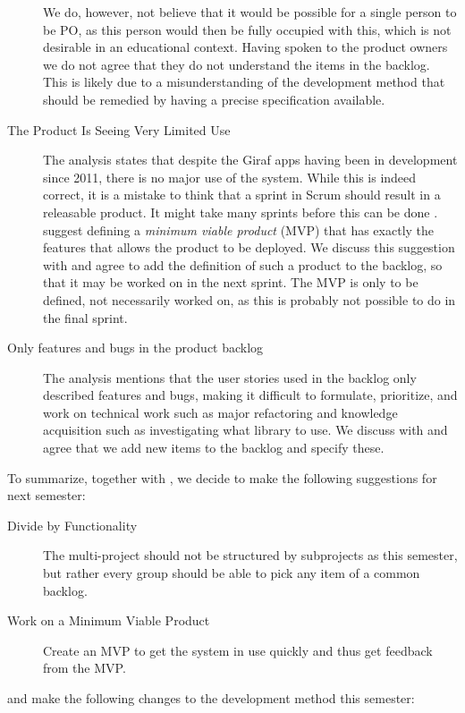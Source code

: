 \begin{description}
  We do, however, not believe that it would be possible for a single person to be PO, as this person would then be fully occupied with this, which is not desirable in an educational context. Having spoken to the product owners we do not agree that they do not understand the items in the backlog. This is likely due to a misunderstanding of the development method that should be remedied by having a precise specification available.
  \item[The Product Is Seeing Very Limited Use] The analysis states that despite the Giraf apps having been in development since 2011, there is no major use of the system. While this is indeed correct, it is a mistake to think that a sprint in Scrum should result in a releasable product. It might take many sprints before this can be done \parencite{larman2003}.  suggest defining a \emph{minimum viable product} (MVP) that has exactly the features that allows the product to be deployed. We discuss this suggestion with  and agree to add the definition of such a product to the backlog, so that it may be worked on in the next sprint. The MVP is only to be defined, not necessarily worked on, as this is probably not possible to do in the final sprint.
  \item[Only features and bugs in the product backlog] The analysis mentions that the user stories used in the backlog only described features and bugs, making it difficult to formulate, prioritize, and work on technical work such as major refactoring and knowledge acquisition such as investigating what library to use. We discuss with  and agree that we add new items to the backlog and specify these.
\end{description}

To summarize, together with , we decide to make the following suggestions for next semester:

\begin{description}
  \item[Divide by Functionality] The multi-project should not be structured by subprojects as this semester, but rather every group should be able to pick any item of a common backlog.
  \item[Work on a Minimum Viable Product] Create an MVP to get the system in use quickly and thus get feedback from the MVP.
\end{description}

and make the following changes to the development method this semester:

